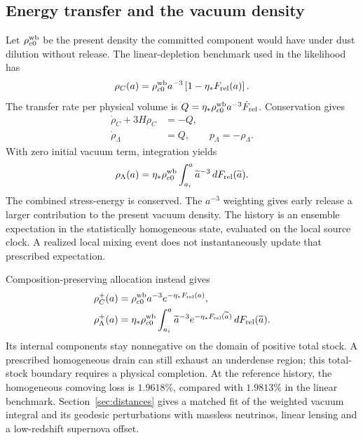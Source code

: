 \subsection{Energy transfer and the vacuum density}

Let $\rho_{c0}^{\rm wb}$ be the present density the committed component
would have under dust dilution without release. The linear-depletion
benchmark used in the likelihood has
\begin{equation}
\rho_C(a)=\rho_{c0}^{\rm wb}a^{-3}
\left[1-\eta_*F_{\rm rel}(a)\right].
\label{eq:rhocommitted}
\end{equation}
The transfer rate per physical volume is
$Q=\eta_*\rho_{c0}^{\rm wb}a^{-3}\dot F_{\rm rel}$. Conservation gives
\begin{align}
\dot\rho_C+3H\rho_C&=-Q,\\
\dot\rho_\Lambda&=Q,\qquad p_\Lambda=-\rho_\Lambda.
\end{align}
With zero initial vacuum term, integration yields
\begin{equation}
\rho_\Lambda(a)=\eta_*\rho_{c0}^{\rm wb}
\int_{a_i}^{a}\widetilde a^{-3}\,dF_{\rm rel}(\widetilde a).
\label{eq:vacuumrelease}
\end{equation}
The combined stress-energy is conserved. The $a^{-3}$ weighting gives
early release a larger contribution to the present vacuum density.
The history is an ensemble expectation in the statistically homogeneous
state, evaluated on the local source clock. A realized local mixing
event does not instantaneously update that prescribed expectation.

Composition-preserving allocation instead gives
\begin{align}
\rho_C^+(a)&=\rho_{c0}^{\rm wb}a^{-3}e^{-\eta_*F_{\rm rel}(a)},\\
\rho_\Lambda^+(a)&=\eta_*\rho_{c0}^{\rm wb}
\int_{a_i}^a\widetilde a^{-3}e^{-\eta_*F_{\rm rel}(\widetilde a)}
\,dF_{\rm rel}(\widetilde a).
\label{eq:positiveallocation}
\end{align}
Its internal components stay nonnegative on the domain of positive total
stock. A prescribed homogeneous drain can still exhaust an underdense
region; this total-stock boundary requires a physical completion.
At the reference history, the homogeneous comoving loss is $1.9618\%$,
compared with $1.9813\%$ in the linear benchmark. Section~\ref{sec:distances}
gives a matched fit of the weighted vacuum integral and its geodesic
perturbations with massless neutrinos, linear lensing and a low-redshift
supernova offset.

